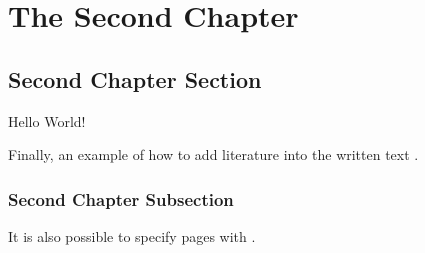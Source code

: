 \chapter{The Second Chapter}

\section{Second Chapter Section}

Hello World!

Finally, an example of how to add literature into the written text \cite{meyers2005effective}.

\blindtext

\subsection{Second Chapter Subsection}

\blindtext

\newpage
\blindtext
It is also possible to specify pages with \cite[see][page 127]{arens2015mathematik}.